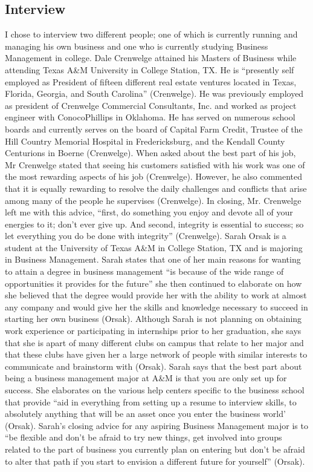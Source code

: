 \begin{multicols}{2}
\section{Interview}
I chose to interview two different people; one of which is currently running and managing his own business and one who is currently studying Business Management in college.
    Dale Crenwelge attained his Masters of Business while attending Texas A\&M University in College Station, TX. He is “presently self employed as President of fifteen different real estate ventures located in Texas, Florida, Georgia, and South Carolina” (Crenwelge).  He was previously employed as president of Crenwelge Commercial Consultants, Inc. and worked as project engineer with ConocoPhillips in Oklahoma. He has served on numerous school boards and currently serves on the board of Capital Farm Credit, Trustee of the Hill Country Memorial Hospital in Fredericksburg, and the Kendall County Centurions in Boerne (Crenwelge). When asked about the best part of his job, Mr Crenwelge stated that seeing his customers satisfied with his work was one of the most rewarding aspects of his job (Crenwelge). However, he also commented that it is equally rewarding to resolve the daily challenges and conflicts that arise among many of the people he supervises (Crenwelge). In closing, Mr. Crenwelge left me with this advice, “first, do something you enjoy and devote all of your energies to it; don’t ever give up. And second, integrity is essential to success; so let everything you do be done with integrity” (Crenwelge).
    Sarah Orsak is a student at the University of Texas A\&M in College Station, TX and is majoring in Business Management. Sarah states that one of her main reasons for wanting to attain a degree in business management “is because of the wide range of opportunities it provides for the future” she then continued to elaborate on how she believed that the degree would provide her with the ability to work at almost any company and would give her the skills and knowledge necessary to succeed in starting her own business (Orsak). Although Sarah is not planning on obtaining work experience or participating in internships prior to her graduation, she says that she is apart of many different clubs on campus that relate to her major and that these clubs have given her a large network of people with similar interests to communicate and brainstorm with (Orsak). Sarah says that the best part about being a business management major at A\&M is that you are only set up for success. She elaborates on the various help centers specific to the business school that provide “aid in everything from setting up a resume to interview skills, to absolutely anything that will be an asset once you enter the business world’ (Orsak). Sarah’s closing advice for any aspiring Business Management major is to “be flexible and don’t be afraid to try new things, get involved into groups related to the part of business you currently plan on entering but don’t be afraid to alter that path if you start to envision a different future for yourself” (Orsak).

\end{multicols}
